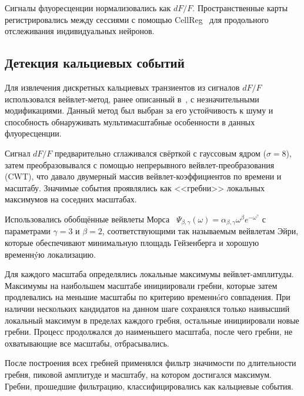 Сигналы флуоресценции нормализовались как $dF/F$. Пространственные карты регистрировались между сессиями с помощью CellReg~\cite{Sheintuch2017} для продольного отслеживания индивидуальных нейронов.



\subsection{Детекция кальциевых событий}\label{sec:event_detection}

Для извлечения дискретных кальциевых транзиентов из сигналов $dF/F$ использовался вейвлет-метод, ранее описанный в~\cite{Neugornet2021}, с незначительными модификациями. Данный метод был выбран за его устойчивость к шуму и способность обнаруживать мультимасштабные особенности в данных флуоресценции.

Сигнал $dF/F$ предварительно сглаживался свёрткой с гауссовым ядром ($\sigma = 8$), затем преобразовывался с помощью непрерывного вейвлет-преобразования (CWT), что давало двумерный массив вейвлет-коэффициентов по времени и масштабу. Значимые события проявлялись как <<гребни>> локальных максимумов на соседних масштабах.

Использовались обобщённые вейвлеты Морса~\cite{Lilly2012} $\Psi_{\beta,\gamma}(\omega) = \alpha_{\beta,\gamma}\omega^{\beta}e^{-\omega^{\gamma}}$ с параметрами $\gamma = 3$ и $\beta = 2$, соответствующими так называемым вейвлетам Эйри, которые обеспечивают минимальную площадь Гейзенберга и хорошую временнýю локализацию.

Для каждого масштаба определялись локальные максимумы вейвлет-амплитуды. Максимумы на наибольшем масштабе инициировали гребни, которые затем продлевались на меньшие масштабы по критерию временнóго совпадения. При наличии нескольких кандидатов на данном шаге сохранялся только наивысший локальный максимум в пределах каждого гребня, остальные инициировали новые гребни. Процесс продолжался до наименьшего масштаба, после чего гребни, не охватывающие все масштабы, отбрасывались.

После построения всех гребней применялся фильтр значимости по длительности гребня, пиковой амплитуде и масштабу, на котором достигался максимум. Гребни, прошедшие фильтрацию, классифицировались как кальциевые события.
